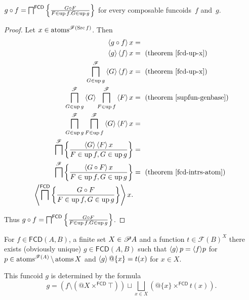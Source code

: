 \begin{thm}
$g\circ f=\bigsqcap^{\mathsf{FCD}}\left\{ \frac{G\circ F}{F\in\operatorname{up} f.G\in\operatorname{up} g}\right\}$ for every
composable funcoids~$f$ and~$g$.\end{thm}
\begin{proof}
Let $x\in\operatorname{atoms}^{\mathscr{F}(\operatorname{Src} f)}$. Then
\begin{align*}
\left\langle g\circ f\right\rangle x & =\\
\left\langle g\right\rangle\left\langle f\right\rangle x & =\text{ (theorem \ref{fcd-up-x})}\\
\bigsqcap_{G\in\operatorname{up} g}^{\mathscr{F}}\left\langle G\right\rangle\left\langle f\right\rangle x & =\text{ (theorem
\ref{fcd-up-x})}\\
\bigsqcap_{G\in\operatorname{up} g}^{\mathscr{F}}\left\langle G\right\rangle\bigsqcap_{F\in\operatorname{up}
f}^{\mathscr{F}}\left\langle F\right\rangle x & =\text{ (theorem \ref{supfun-genbase})}\\
\bigsqcap_{G\in\operatorname{up} g}^{\mathscr{F}}\bigsqcap_{F\in\operatorname{up} f}^{\mathscr{F}}\left\langle G\right\rangle\left\langle F\right\rangle x & =\\
\bigsqcap^{\mathscr{F}}\left\{ \frac{\left\langle G\right\rangle\left\langle F\right\rangle x}{F\in\operatorname{up} f,G\in\operatorname{up} g}\right\} & =\\
\bigsqcap^{\mathscr{F}}\left\{ \frac{\left\langle G\circ F\right\rangle x}{F\in\operatorname{up} f,G\in\operatorname{up} g}\right\} & =\text{ (theorem
\ref{fcd-intrs-atom})}\\
\left\langle \bigsqcap^{\mathsf{FCD}}\left\{ \frac{G\circ F}{F\in\operatorname{up} f,G\in\operatorname{up} g}\right\}\right\rangle x.
\end{align*}


Thus $g\circ f=\bigsqcap^{\mathsf{FCD}}\left\{ \frac{G\circ F}{F\in\operatorname{up} f.G\in\operatorname{up} g}\right\}$.\end{proof}

\begin{prop}
  For $f \in \mathsf{FCD} (A, B)$, a finite set $X \in \mathscr{P} A$
  and a function $t \in \mathscr{F} (B)^X$ there exists (obviously unique) $g
  \in \mathsf{FCD} (A, B)$ such that $\left\langle g\right\rangle p = \langle f
  \rangle p$ for $p \in \operatorname{atoms}^{\mathscr{F} (A)} \setminus \operatorname{atoms}
  X$ and $\left\langle g\right\rangle @\{ x \} = t (x)$ for $x \in X$.

  This funcoid $g$ is determined by the formula
  \[ g = (f \setminus (@X \times^{\mathsf{FCD}} \top)) \sqcup
     \bigsqcup_{x \in X} (@\{ x \} \times^{\mathsf{FCD}} t (x)) . \]
\end{prop}

